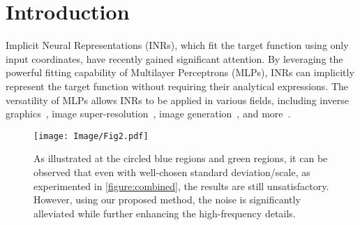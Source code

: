 \section{Introduction}
Implicit Neural Representations (INRs), which fit the target function using only input coordinates, have recently gained significant attention.
%
By leveraging the powerful fitting capability of Multilayer Perceptrons (MLPs), INRs can implicitly represent the target function without requiring their analytical expressions. 
%
The versatility of MLPs allows INRs to be applied in various fields, including inverse graphics~\citep{mildenhall2021nerf, barron2023zip, martin2021nerf}, image super-resolution~\citep{chen2021learning, yuan2022sobolev, gao2023implicit}, 
image generation~\citep{skorokhodov2021adversarial}, and more~\citep{chen2021nerv, strumpler2022implicit, shue20233d}.
%
\begin{figure}
    \texttt{[image: Image/Fig2.pdf]}
    \caption{As illustrated at the circled blue regions and green regions, it can be observed that even with well-chosen standard deviation/scale, as experimented in \autoref{figure:combined}, the results are still unsatisfactory. However, using our proposed method, the noise is significantly alleviated while further enhancing the high-frequency details.}
    \label{fig:var}
    \vspace{-10pt}
\end{figure}

